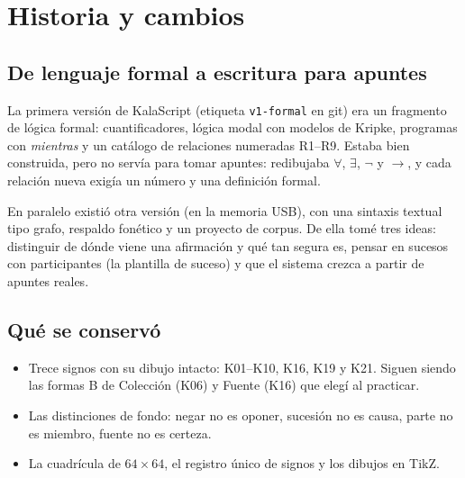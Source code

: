 \section{Historia y cambios}\label{sec:cambios}

\subsection{De lenguaje formal a escritura para apuntes}
La primera versión de KalaScript (etiqueta \texttt{v1-formal} en git) era un
fragmento de lógica formal: cuantificadores, lógica modal con modelos de
Kripke, programas con \emph{mientras} y un catálogo de relaciones numeradas
R1--R9. Estaba bien construida, pero no servía para tomar apuntes: redibujaba
\(\forall\), \(\exists\), \(\neg\) y \(\to\), y cada relación nueva exigía un
número y una definición formal.

En paralelo existió otra versión (en la memoria USB), con una sintaxis textual
tipo grafo, respaldo fonético y un proyecto de corpus. De ella tomé tres ideas:
distinguir de dónde viene una afirmación y qué tan segura es, pensar en
sucesos con participantes (la plantilla de suceso) y que el sistema crezca a
partir de apuntes reales.

\subsection{Qué se conservó}
\begin{itemize}
\item Trece signos con su dibujo intacto: K01--K10, K16, K19 y K21. Siguen
 siendo las formas B de Colección (K06) y Fuente (K16) que elegí al practicar.
\item Las distinciones de fondo: negar no es oponer, sucesión no es causa, parte
 no es miembro, fuente no es certeza.
\item La cuadrícula de \(64\times64\), el registro único de signos y los
 dibujos en TikZ.
\end{itemize}

